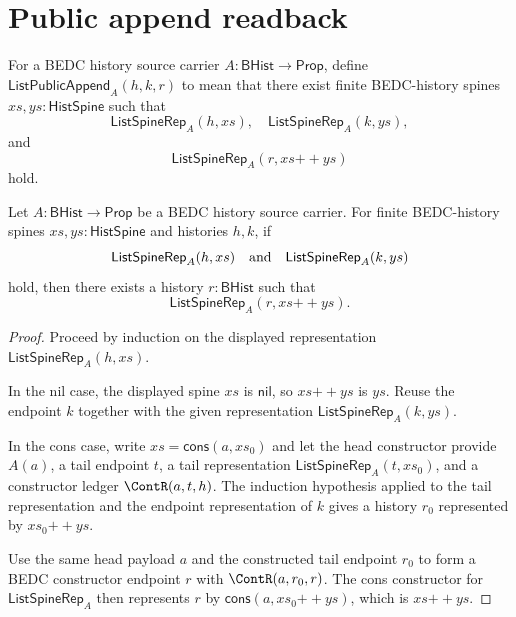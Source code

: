 \section{Public append readback}
\label{sec:list-public-append-readback}

\begin{definition}
\label{def:list-public-append-readback}
For a BEDC history source carrier $A:\mathsf{BHist}\to\mathsf{Prop}$, define
$\mathsf{ListPublicAppend}_A(h,k,r)$ to mean that there exist finite
BEDC-history spines $xs,ys:\mathsf{HistSpine}$ such that
$$
\mathsf{ListSpineRep}_A(h,xs),
\quad
\mathsf{ListSpineRep}_A(k,ys),
$$
and
$$
\mathsf{ListSpineRep}_A(r,xs{++}ys)
$$
hold.
\end{definition}

\begin{lemma}
\label{lem:list-spine-append-representation-construction}
Let $A:\mathsf{BHist}\to\mathsf{Prop}$ be a BEDC history source carrier. For
finite BEDC-history spines $xs,ys:\mathsf{HistSpine}$ and histories $h,k$, if
$$
\mathsf{ListSpineRep}_A(h,xs)
\quad\hbox{and}\quad
\mathsf{ListSpineRep}_A(k,ys)
$$
hold, then there exists a history $r:\mathsf{BHist}$ such that
$$
\mathsf{ListSpineRep}_A(r,xs{++}ys).
$$
\end{lemma}
\begin{proof}
Proceed by induction on the displayed representation
$\mathsf{ListSpineRep}_A(h,xs)$.

In the nil case, the displayed spine $xs$ is $\mathsf{nil}$, so
$xs{++}ys$ is $ys$. Reuse the endpoint $k$ together with the given
representation $\mathsf{ListSpineRep}_A(k,ys)$.

In the cons case, write $xs=\mathsf{cons}(a,xs_0)$ and let the head
constructor provide $A(a)$, a tail endpoint $t$, a tail representation
$\mathsf{ListSpineRep}_A(t,xs_0)$, and a constructor ledger $\ContR(a,t,h)$.
The induction hypothesis applied to the tail representation and the endpoint
representation of $k$ gives a history $r_0$ represented by $xs_0{++}ys$.

Use the same head payload $a$ and the constructed tail endpoint $r_0$ to form a
BEDC constructor endpoint $r$ with $\ContR(a,r_0,r)$. The cons constructor for
$\mathsf{ListSpineRep}_A$ then represents $r$ by
$\mathsf{cons}(a,xs_0{++}ys)$, which is $xs{++}ys$.
\end{proof}


